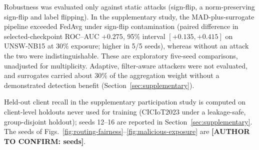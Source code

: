 Robustness was evaluated only against static attacks (sign-flip, a norm-preserving sign-flip and label flipping). In the supplementary study, the MAD-plus-surrogate pipeline exceeded FedAvg under sign-flip contamination (paired difference in selected-checkpoint ROC--AUC $+0.275$, 95\% interval $[+0.135,+0.415]$ on UNSW-NB15 at 30\% exposure; higher in 5/5 seeds), whereas without an attack the two were indistinguishable. These are exploratory five-seed comparisons, unadjusted for multiplicity. Adaptive, filter-aware attackers were not evaluated, and surrogates carried about 30\% of the aggregation weight without a demonstrated detection benefit (Section~\ref{sec:supplementary}).

Held-out client recall in the supplementary participation study is computed on client-level holdouts never used for training (CICIoT2023 under a leakage-safe, group-disjoint holdout); seeds 12--16 are reported in Section~\ref{sec:supplementary}. The seeds of Figs.~\ref{fig:routing-fairness}--\ref{fig:malicious-exposure} are \textbf{[AUTHOR TO CONFIRM: seeds]}.

